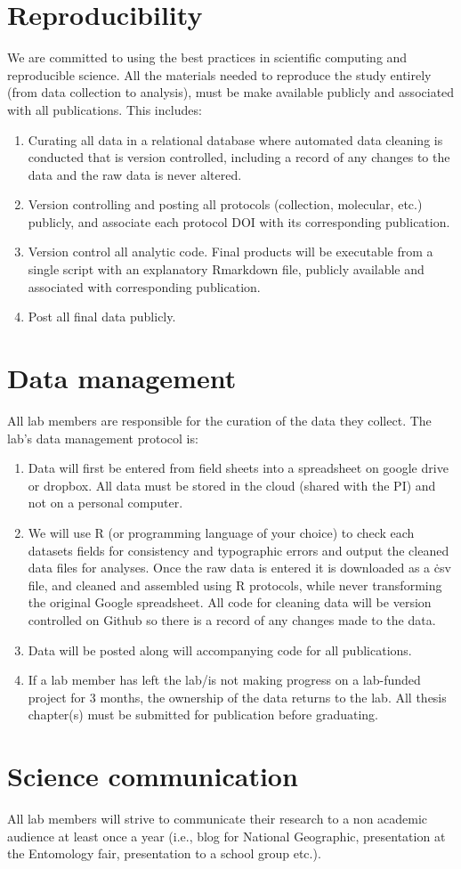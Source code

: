 \documentclass[12pt]{article}
\begin{document}
\section{Reproducibility}
We are committed to using the best practices in scientific computing
and reproducible science. All the
materials needed to reproduce the study entirely (from data collection
to analysis), must be make available publicly and associated with all
publications. This includes:
\begin{enumerate}
\item Curating all data in a relational database where automated
  data cleaning is conducted that is version controlled, including a
  record of any changes to the data and the raw data is never altered.
\item Version controlling and posting all protocols (collection,
  molecular, etc.) publicly, and associate each protocol DOI with its
  corresponding publication.
\item Version control all analytic code. Final products will be
  executable from a single script with an explanatory Rmarkdown file,
  publicly available and associated with corresponding publication.
\item Post all final data publicly.
\end{enumerate}

\section{Data management}
All lab members are responsible for the curation of the data they
collect. The lab's data management protocol is:

\begin{enumerate}
\item Data will first be entered from field sheets into a spreadsheet
  on google drive or dropbox. All data must be stored in the cloud
  (shared with the PI) and not on a personal computer.
\item We will use R (or programming language of your choice) to check
  each datasets fields for consistency and typographic errors and
  output the cleaned data files for analyses. Once the raw data is entered
  it is downloaded as a \.csv file, and cleaned and
  assembled using R protocols, while never transforming the original
  Google spreadsheet. All code for cleaning data will be version
  controlled on Github so there is a record of any changes made to the
  data.
\item Data will be posted along will accompanying code for all
  publications.
\item If a lab member has left the lab/is not making progress on a
  lab-funded project for 3 months, the ownership of the data returns
  to the lab. All thesis chapter(s) must be submitted for publication
  before graduating.
\end{enumerate}

\section{Science communication}
All lab members will strive to communicate their research to a non academic
audience at least once a year (i.e., blog for National Geographic,
presentation at the Entomology fair, presentation to a school group
etc.).
\end{document}
